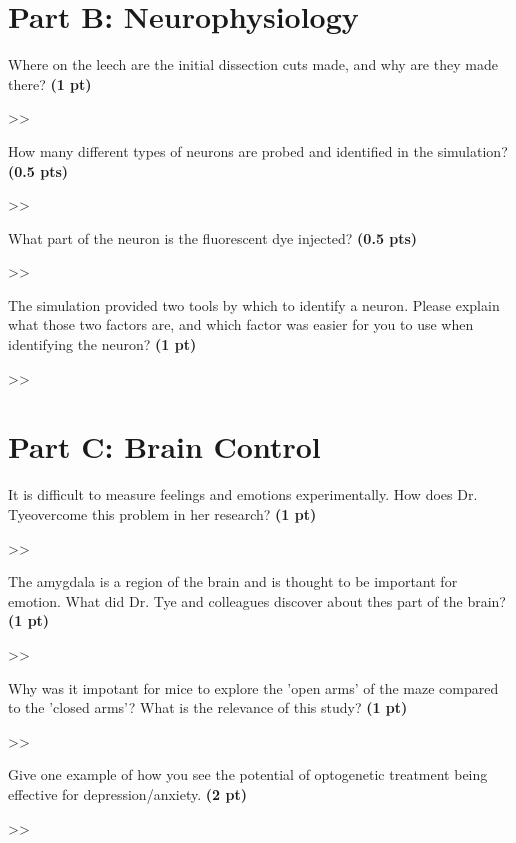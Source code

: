 \documentclass[12pt,a4paper]{article}
\begin{document}
\section*{Part B: Neurophysiology}
\begin{enumerate}[font=\bfseries, wide, resume]
    {\color{under}\item Where on the leech are the initial dissection cuts made, and why are they made there? \textbf{(1 pt)}}

    >> 
    {\color{under}\item How many different types of neurons are probed and identified in the simulation?\textbf{(0.5 pts)}}

    >> 
    {\color{under}\item What part of the neuron is the fluorescent dye injected? \textbf{(0.5 pts)}}

    >> 
    {\color{under}\item The simulation provided two tools by which to identify a neuron. Please explain what those two factors are, and which factor was easier for you to use when identifying the neuron? \textbf{(1 pt)}}

    >> 
\end{enumerate}
    
\section*{Part C: Brain Control}
\begin{enumerate}[font=\bfseries, wide, resume]
    {\color{under}\item It is difficult to measure feelings and emotions experimentally. How does Dr. Tyeovercome this problem in her research? \textbf{(1 pt)}}

    >> 
    {\color{under}\item The amygdala is a region of the brain and is thought to be important for emotion. What did Dr. Tye and colleagues discover about thes part of the brain? \textbf{(1 pt)}}

    >> 
    {\color{under}\item Why was it impotant for mice to explore the 'open arms' of the maze compared to the 'closed arms'? What is the relevance of this study? \textbf{(1 pt)}}

    >> 
    {\color{under}\item Give one example of how you see the potential of optogenetic treatment being effective for depression/anxiety. \textbf{(2 pt)}}

    >> 
\end{enumerate}
\end{document}
